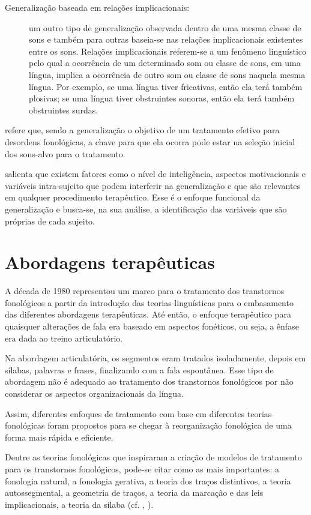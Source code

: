 \documentclass[output=paper,colorlinks,citecolor=brown,booklanguage=portuguese]{langscibook}
\begin{document}
\begin{description}
\item[Generalização baseada em relações implicacionais:] um outro tipo de generalização observada dentro de uma mesma classe de sons e também para outras baseia-se nas relações implicacionais existentes entre os sons. Relações implicacionais referem-se a um fenômeno linguístico pelo qual a ocorrência de um determinado som ou classe de sons, em uma língua, implica a ocorrência de outro som ou classe de sons naquela mesma língua. Por exemplo, se uma língua tiver fricativas, então ela terá também plosivas; se uma língua tiver obstruintes sonoras, então ela terá também obstruintes surdas.
\end{description}
\fussy

\citet{Gierut1992} refere que, sendo a generalização o objetivo de um tratamento efetivo para desordens fonológicas, a chave para que ela ocorra pode estar na seleção inicial dos sons-alvo para o tratamento.

\citet{Mota2001} salienta que existem fatores como o nível de inteligência, aspectos motivacionais e variáveis intra-sujeito que podem interferir na generalização e que são relevantes em qualquer procedimento terapêutico. Esse é o enfoque funcional da generalização e busca-se, na sua análise, a identificação das variáveis que são próprias de cada sujeito. 

\section{Abordagens terapêuticas}\label{sec:sec2cap5}

A década de 1980 representou um marco para o tratamento dos transtornos fonológicos a partir da introdução das teorias linguísticas para o embasamento das diferentes abordagens terapêuticas. Até então, o enfoque terapêutico para quaisquer alterações de fala era baseado em aspectos fonéticos, ou seja, a ênfase era dada ao treino articulatório.

Na abordagem articulatória, os segmentos eram tratados isoladamente, depois em sílabas, palavras e frases, finalizando com a fala espontânea. Esse tipo de abordagem não é adequado ao tratamento dos transtornos fonológicos por não considerar os aspectos organizacionais da língua.

Assim, diferentes enfoques de tratamento com base em diferentes teorias fonológicas foram propostos para se chegar à reorganização fonológica de uma forma mais rápida e eficiente. 

Dentre as teorias fonológicas que inspiraram a criação de modelos de tratamento para os transtornos fonológicos, pode-se citar como as mais importantes: a fonologia natural, a fonologia gerativa, a teoria dos traços distintivos, a teoria autossegmental, a geometria de traços, a teoria da marcação e das leis implicacionais, a teoria da sílaba (cf. , ).
\end{document}
